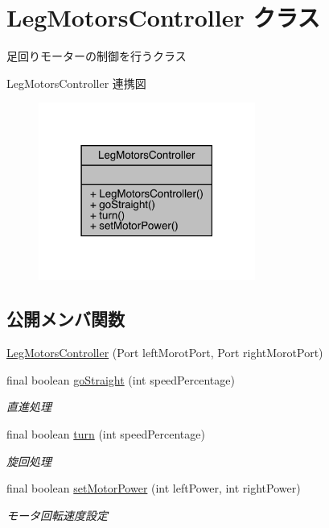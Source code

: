 \hypertarget{class_leg_motors_controller}{}\section{Leg\+Motors\+Controller クラス}
\label{class_leg_motors_controller}


足回りモーターの制御を行うクラス  




Leg\+Motors\+Controller 連携図\nopagebreak
\begin{figure}[H]
\begin{center}
\leavevmode
\includegraphics[width=202pt]{d4/d01/class_leg_motors_controller__coll__graph}
\end{center}
\end{figure}
\subsection*{公開メンバ関数}
\begin{DoxyCompactItemize}
\item 
\mbox{\hyperlink{class_leg_motors_controller_afb404bdad1a5ce5d9f71b73ade3ccbb5}{Leg\+Motors\+Controller}} (Port left\+Morot\+Port, Port right\+Morot\+Port)
\item 
final boolean \mbox{\hyperlink{class_leg_motors_controller_ad5a3db7ac941bb2e66d3efb5e3214a54}{go\+Straight}} (int speed\+Percentage)
\begin{DoxyCompactList}\small\item\em 直進処理 \end{DoxyCompactList}\item 
final boolean \mbox{\hyperlink{class_leg_motors_controller_a0df4b63d6a21857d8b5fbff3875ff962}{turn}} (int speed\+Percentage)
\begin{DoxyCompactList}\small\item\em 旋回処理 \end{DoxyCompactList}\item 
final boolean \mbox{\hyperlink{class_leg_motors_controller_ae5857bf258e2820255f1b5775140385a}{set\+Motor\+Power}} (int left\+Power, int right\+Power)
\begin{DoxyCompactList}\small\item\em モータ回転速度設定 \end{DoxyCompactList}\end{DoxyCompactItemize}


